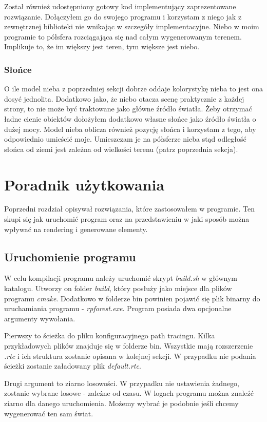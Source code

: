 \documentclass[inz,longabstract]{iithesis}
\begin{document}
            Został również udostępniony gotowy kod implementujący zaprezentowane rozwiązanie. Dołączyłem go do swojego programu i korzystam z niego jak z zewnętrznej biblioteki nie wnikając w szczegóły implementacyjne. Niebo w moim programie to półsfera rozciągająca się nad całym wygenerowanym terenem. Implikuje to, że im większy jest teren, tym większe jest niebo.
        
        \subsection{Słońce}
            O ile model nieba z poprzedniej sekcji dobrze oddaje kolorystykę nieba to jest ona dosyć jednolita. Dodatkowo jako, że niebo otacza scenę praktycznie z każdej strony, to nie może być traktowane jako główne źródło światła. Żeby otrzymać ładne cienie obiektów dołożyłem dodatkowo własne słońce jako źródło światła o dużej mocy. Model nieba oblicza również pozycję słońca i korzystam z tego, aby odpowiednio umieścić moje. Umieszczam je na półsferze nieba stąd odległość słońca od ziemi jest zależna od wielkości terenu (patrz poprzednia sekcja).
            
\chapter{Poradnik użytkowania}
    Poprzedni rozdział opisywał rozwiązania, które zastosowałem w programie. Ten skupi się jak uruchomić program oraz na przedstawieniu w jaki sposób można wpływać na rendering i generowane elementy.
    
    \section{Uruchomienie programu}
        W celu kompilacji programu należy uruchomić skrypt \textit{build.sh} w głównym katalogu. Utworzy on folder \textit{build}, który posłuży jako miejsce dla plików programu \textit{cmake}. Dodatkowo w folderze bin powinien pojawić się plik binarny do uruchamiania programu - \textit{rpforest.exe}. Program posiada dwa opcjonalne argumenty wywołania. 
        
        Pierwszy to ścieżka do pliku konfiguracyjnego path tracingu. Kilka przykładowych plików znajduje się w folderze bin. Wszystkie mają rozszerzenie \textit{.rtc} i ich struktura zostanie opisana w kolejnej sekcji. W przypadku nie podania ścieżki zostanie załadowany plik \textit{default.rtc}.
        
        Drugi argument to ziarno losowości. W przypadku nie ustawienia żadnego, zostanie wybrane losowe - zależne od czasu. W logach programu można znaleźć ziarno dla danego uruchomienia. Możemy wybrać je podobnie jeśli chcemy wygenerować ten sam świat. 
        
\end{document}
